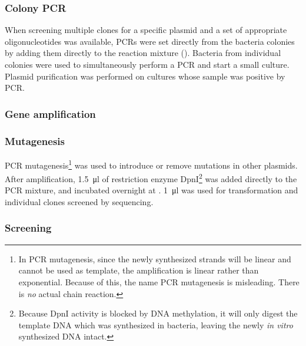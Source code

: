     
    \subsubsection{Colony PCR}
      When screening multiple clones for a specific plasmid and a set of appropriate oligonucleotides was available,
      PCRs were set directly from the bacteria colonies by adding them directly to the reaction mixture
      (). Bacteria from individual colonies were used to simultaneously perform a PCR and
      start a small culture. Plasmid purification was performed on cultures whose sample was positive by PCR.

    \subsubsection{Gene amplification}

    \subsubsection{Mutagenesis}
      PCR mutagenesis\footnote{In PCR mutagenesis, since the newly synthesized strands will be linear and cannot be
      used as template, the amplification is linear rather than exponential. Because of this, the name PCR
      mutagenesis is misleading. There is \emph{no} actual chain reaction.} was used to introduce or remove mutations
      in other plasmids. After amplification, \SI{1.5}{\ul} of restriction enzyme DpnI\footnote{Because
      DpnI activity is blocked by DNA methylation, it will only digest the template DNA which was synthesized in bacteria,
      leaving the newly \textit{in vitro} synthesized DNA intact.} was added directly to the PCR mixture, and incubated
      overnight at . \SI{1}{\ul} was used for transformation and individual clones screened by sequencing.
      

    \subsubsection{Screening}
    

